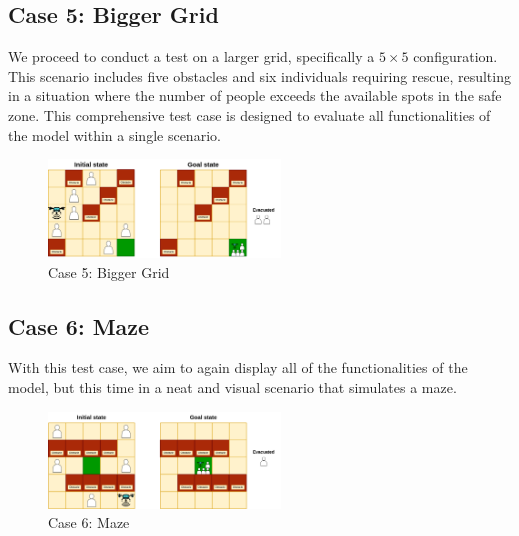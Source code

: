 \documentclass{article}
\begin{document}
\FloatBarrier

\subsection{Case 5: Bigger Grid}

We proceed to conduct a test on a larger grid, specifically a \(5 \times 5\) configuration. This scenario includes five obstacles and six individuals requiring rescue, resulting in a situation where the number of people exceeds the available spots in the safe zone. This comprehensive test case is designed to evaluate all functionalities of the model within a single scenario.

\begin{figure}[ht]
    \centering
    \includegraphics[width=0.55\textwidth]{assets/problem-5-big.drawio.png}
    \caption{Case 5: Bigger Grid}
    \label{fig:initial-state-bigger-grid}
\end{figure}

\FloatBarrier

\subsection{Case 6: Maze}

With this test case, we aim to again display all of the functionalities of the model, but this time in a neat and visual scenario that simulates a maze.

\begin{figure}[ht]
    \centering
    \includegraphics[width=0.55\textwidth]{assets/problem-6-maze.drawio.png} %
    \caption{Case 6: Maze}
    \label{fig:initial-state-maze}
\end{figure}
\end{document}
